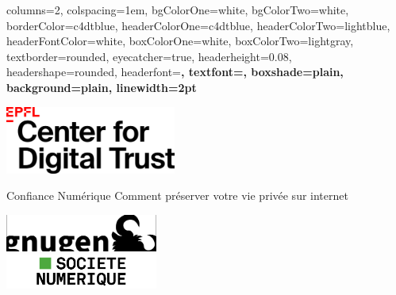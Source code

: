 \documentclass[a0paper,portrait]{baposter}
\begin{document}
\begin{poster}{
  columns=2,
  colspacing=1em,
  bgColorOne=white,
  bgColorTwo=white,
  borderColor=c4dtblue,
  headerColorOne=c4dtblue,
  headerColorTwo=lightblue,
  headerFontColor=white,
  boxColorOne=white,
  boxColorTwo=lightgray,
  textborder=rounded,
  eyecatcher=true,
  headerheight=0.08\textheight,
  headershape=rounded,
  headerfont=\huge\bf\textsf,
  textfont={\setlength{\parindent}{0em}\large},
  boxshade=plain,
  background=plain,
  linewidth=2pt
}{
\begin{minipage}{5cm}
\includegraphics[height=6em]{assets/logos/C4DT_logo.png}%
\end{minipage}
}
{Confiance Numérique}
{Comment préserver votre vie privée sur internet}
{
\begin{minipage}{5cm}
\includegraphics[width=5cm]{assets/logos/gnugen_logo.png} \\
\includegraphics[width=5cm]{assets/logos/digiges_logo.png}
\end{minipage}
}

\end{poster}
\end{document}
